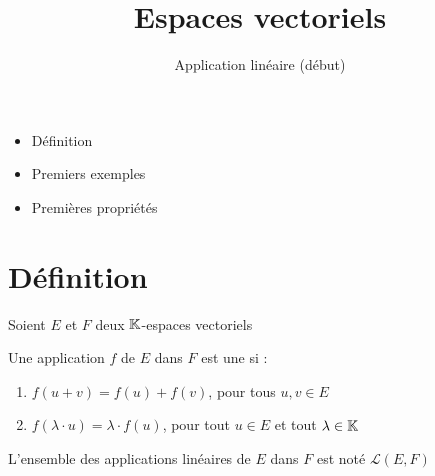 






\title{{\bf Espaces vectoriels}}
\subtitle{Application linéaire (début)}

\begin{frame}
  
  \debutmontitre

  \pause

{\footnotesize
\hfill
{}
\begin{minipage}{0.6\textwidth}
  \begin{itemize}
    \item<3-> Définition
    \item<4-> Premiers exemples
    \item<5-> Premières propriétés   
  \end{itemize}
\end{minipage}
}

\end{frame}

\setcounter{framenumber}{0}


\section{Définition}

\begin{frame}

Soient $E$ et $F$ deux $\mathbb{K}$-espaces vectoriels
\begin{mydefinition}
Une application $f$ de $E$ dans $F$ est une  si : 
\pause
\begin{enumerate}
  \item $f(u+v)=f(u)+f(v)$, pour tous $u, v \in  E$ 
\pause
  \item $f(\lambda \cdot u)=\lambda \cdot f(u)$, pour tout $u \in E$ et tout $\lambda \in \mathbb{K}$
\end{enumerate}
\end{mydefinition}

\bigskip
\pause

L'ensemble des applications linéaires de $E$ dans $F$ est noté $\mathcal{L}(E,F)$

\end{frame}




